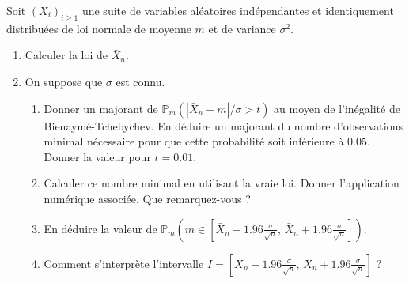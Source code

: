 \smallskip

\begin{mdframed}
\begin{exercice}
Soit $(X_i)_{i \ge 1}$ une suite de variables aléatoires indépendantes et identiquement distribuées de loi normale de moyenne $m$ et de variance $\sigma^2$.

\begin{enumerate}
    \item Calculer la loi de $\bar{X}_n$.
    \item On suppose que $\sigma$ est connu.
    \begin{enumerate}
        \item[i--] Donner un majorant de $\mathbb{P}_m\left( |\bar{X}_n - m|/\sigma > t \right)$ au moyen de l'inégalité de Bienaymé-Tchebychev. En déduire un majorant du nombre d'observations minimal nécessaire pour que cette probabilité soit inférieure à $0.05$. Donner la valeur pour $t = 0.01$.
        \item[ii--] Calculer ce nombre minimal en utilisant la vraie loi. Donner l'application numérique associée. Que remarquez-vous ?
        \item[iii--] En déduire la valeur de $\mathbb{P}_m\left( m \in \left[ \bar{X}_n - 1.96 \frac{\sigma}{\sqrt{n}}, \, \bar{X}_n + 1.96 \frac{\sigma}{\sqrt{n}} \right] \right)$.
        \item[iv--] Comment s'interprète l'intervalle $I = \left[ \bar{X}_n - 1.96 \frac{\sigma}{\sqrt{n}}, \, \bar{X}_n + 1.96 \frac{\sigma}{\sqrt{n}} \right]$ ?
    \end{enumerate}
\end{enumerate}
\end{exercice}
\end{mdframed}

\smallskip

